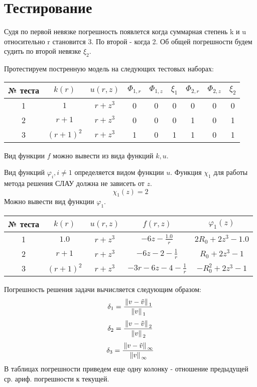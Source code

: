 \section{Тестирование}

Судя по первой невязке погрешность появлется когда суммарная степень k и u относительно r становится 3. По второй - когда 2. Об общей погрешности будем судить по второй невязке $\xi_2$.

Протестируем постренную модель на следующих тестовых наборах:
\begin{center}
  \begin{tabular}{c|c c|c c |c| c c|c}
  \toprule
  № теста & $k(r)$ & $u(r, z)$ & $\Phi_{1,r}$ & $\Phi_{1,z}$ & $\xi_1$ & $\Phi_{2,r}$ & $\Phi_{2,z}$ & $\xi_2$ \\
  \midrule
  1 & $ 1 $ & $r + z^3$                     & 0 & 0 & 0 & 0 & 0 & 0 \\
  2 & $ r + 1 $ & $r + z^3$                 & 0 & 0 & 0 & 1 & 0 & 1 \\
  3 & $ (r + 1)^2 $ & $r + z^3$             & 1 & 0 & 1 & 1 & 0 & 1 \\
  \bottomrule
  \end{tabular}
\end{center}
Вид функции $f$ можно вывести из вида функций $k,u$.

Вид функций $\varphi_i, i\neq1$ определяется видом функции $u$. Функция $\chi_1$ для работы метода решения СЛАУ должна не зависеть от $z$.
\[\chi_1(z) = 2\]
Можно вывести вид функции $\varphi_1$.

\begin{center}
  \begin{tabular}{c|c c|c c}
  \toprule
  № теста & $k(r)$ & $u(r, z)$ & $f(r, z)$ & $\varphi_1(z)$ \\
  \midrule
1&$1.0$&$r + z^{3}$&$- 6 z - \frac{1.0}{r}$&$2 R_{0} + 2 z^{3} - 1.0$\\
2&$r + 1$&$r + z^{3}$&$- 6 z - 2 - \frac{1}{r}$&$R_{0} + 2 z^{3} - 1$\\
3&$\left(r + 1\right)^{2}$&$r + z^{3}$&$- 3 r - 6 z - 4 - \frac{1}{r}$&$- R_{0}^{2} + 2 z^{3} - 1$\\
  \bottomrule
  \end{tabular}
\end{center}

Погрешность решения задачи вычисляется следующим образом:
\[ \delta_1 = \frac{\left. \|v - \Tilde{v}\| \right._1}{\left. \|v\| \right._1} \]
\[ \delta_2 = \frac{\left. \|v - \Tilde{v}\| \right._2}{\left. \|v\| \right._2} \]
\[ \delta_3 = \frac{\left. \|v - \Tilde{v}\| \right._\infty}{\left. \|v\| \right._\infty} \]
В таблицах погрешности приведем еще одну колонку - отношение предыдущей ср. ариф. погрешности к текущей.

